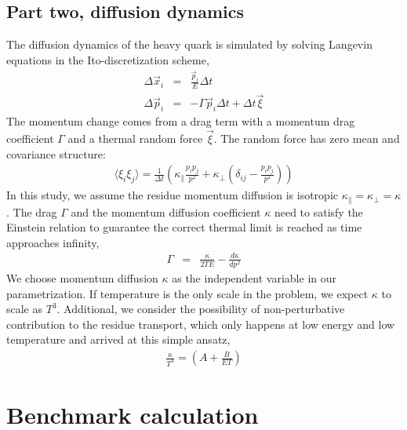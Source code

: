 \documentclass[aps, prc, reprint, amsmath, groupedaddress, nofootinbib]{revtex4-1}
\newcommand{\Kpara}{\kappa_{\|}}
\newcommand{\Kperp}{\kappa_{\perp}}
\begin{document}
\subsection{Part two, diffusion dynamics}
The diffusion dynamics of the heavy quark is simulated by solving Langevin equations in the Ito-discretization scheme,
\begin{eqnarray}
\Delta \vec{x}_i &=& \frac{\vec{p}_i}{E} \Delta t	\\
\Delta \vec{p}_i &=& -\Gamma \vec{p}_i \Delta t + \Delta t \vec{\xi}
\end{eqnarray}
The momentum change comes from a drag term with a momentum drag coefficient $\Gamma$ and a thermal random force $\vec{\xi}$. 
The random force has zero mean and covariance structure:
\begin{eqnarray}
\langle \xi_i \xi_j \rangle = \frac{1}{\Delta t}\left(\Kpara \frac{p_i p_j}{p^2} + \Kperp \left(\delta_{ij} - \frac{p_i p_j}{p^2}\right) \right)
\end{eqnarray}
In this study, we assume the residue momentum diffusion is isotropic $\Kpara=\Kperp=\kappa$.
The drag $\Gamma$ and the momentum diffusion coefficient $\kappa$ need to satisfy the Einstein relation to guarantee the correct thermal limit is reached as time approaches infinity,
\begin{eqnarray}
\Gamma &=& \frac{\kappa}{2TE} - \frac{d\kappa}{dp^2}
\end{eqnarray}
We choose momentum diffusion $\kappa$ as the independent variable in our parametrization.
If temperature is the only scale in the problem, we expect $\kappa$ to scale as $T^3$.
Additional, we consider the possibility of non-perturbative contribution to the residue transport, which only happens at low energy and low temperature and arrived at this simple ansatz,
\begin{eqnarray}
\frac{\kappa}{T^3} = \left(A + \frac{B}{ET}\right)
\end{eqnarray}

\section{Benchmark calculation}
\end{document}
